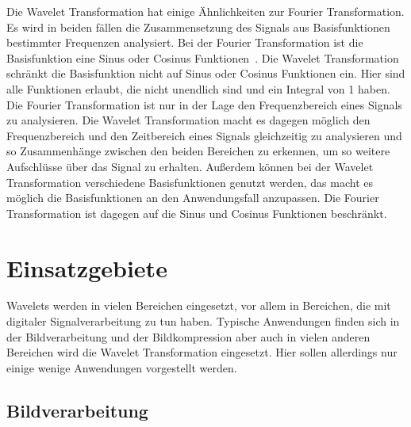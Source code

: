 \documentclass[12pt, a4paper, ngerman]{article}
\begin{document}
Die Wavelet Transformation hat einige Ähnlichkeiten zur Fourier Transformation.
Es wird in beiden fällen die Zusammensetzung des Signals aus Basisfunktionen bestimmter Frequenzen analysiert.
Bei der Fourier Transformation ist die Basisfunktion eine Sinus oder Cosinus Funktionen~\cite[S.5]{wavelets_intro}.
Die Wavelet Transformation schränkt die Basisfunktion nicht auf Sinus oder Cosinus Funktionen ein.
Hier sind alle Funktionen erlaubt, die nicht unendlich sind und ein Integral von 1 haben.
Die Fourier Transformation ist nur in der Lage den Frequenzbereich eines Signals zu analysieren.
Die Wavelet Transformation macht es dagegen möglich den Frequenzbereich und den Zeitbereich eines Signals
gleichzeitig zu analysieren und so Zusammenhänge zwischen den beiden Bereichen zu erkennen,
um so weitere Aufschlüsse über das Signal zu erhalten.
Außerdem können bei der Wavelet Transformation verschiedene Basisfunktionen genutzt werden,
das macht es möglich die Basisfunktionen an den Anwendungsfall anzupassen.
Die Fourier Transformation ist dagegen auf die Sinus und Cosinus Funktionen beschränkt.

\section{Einsatzgebiete}

Wavelets werden in vielen Bereichen eingesetzt,
vor allem in Bereichen, die mit digitaler Signalverarbeitung zu tun haben.
Typische Anwendungen finden sich in der Bildverarbeitung und der Bildkompression
aber auch in vielen anderen Bereichen wird die Wavelet Transformation eingesetzt.
Hier sollen allerdings nur einige wenige Anwendungen vorgestellt werden.

\subsection{Bildverarbeitung}
\end{document}
